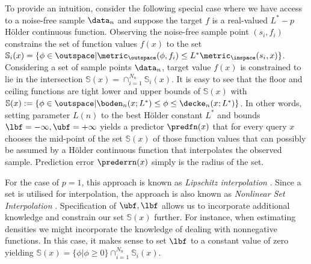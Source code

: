 To provide an intuition, consider the following special case where we have access to a noise-free sample $\data_n$ and suppose 
the target $f$ is a real-valued $L^*-p$ H\"older continuous function. Observing the noise-free sample point $(s_i,f_i)$ constrains the set of function values $f(x)$ to the set $\mathbb S_i(x) =\{ \phi \in \outspace | \metric_\outspace(\phi, f_i) \leq L^* \metric_\inspace(s_i,x) \}$. Considering a set of sample points $\data_n$, target value $f(x)$ is constrained to lie in the intersection $\mathbb S(x)=\cap_{i=1}^{N_n} \mathbb S_i(x)$. It is easy to see that the floor and ceiling functions are tight lower and upper bounds of $\mathbb S(x)$ with $\mathbb S(x) := \{ \phi \in \outspace | \boden_n(x; L^*) \leq \phi \leq \decke_n(x;L^*)\}$. In other words, setting parameter $L(n)$ to the best H\"older constant $L^*$ and bounds $\lbf =-\infty,\ubf=+\infty$ yields a predictor $\predfn(x)$ that for every query $x$ chooses the mid-point of the set $\mathbb S(x)$ of those function values that can possibly be assumed by a H\"older continuous function that interpolates the observed sample. Prediction error $\prederrn(x)$ simply is the radius of the set.

For the case of $p=1$, this approach is known as \emph{Lipschitz interpolation} \cite{Beliakov2006,Zabinsky2003}. Since a set is utilised for interpolation, the approach is also known as \emph{Nonlinear Set Interpolation} \cite{Milanese2004}. Specification of $\ubf,\lbf$ allows us to incorporate additional knowledge and constrain our set $\mathbb S(x)$ further. 
For instance, when estimating densities we might incorporate the knowledge of dealing with nonnegative functions. In this case, it makes sense to set $\lbf$ to a constant value of zero yielding $\mathbb S(x) = \{\phi | \phi \geq 0 \} \cap_{i=1}^{N_n} \mathbb S_i(x) $.

